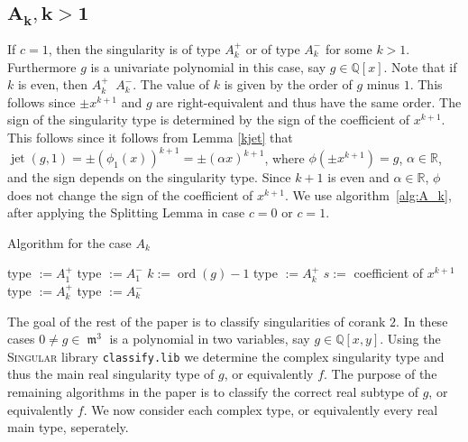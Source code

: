 \documentclass[noend]{amsproc}
\DeclareMathOperator{\ord}{ord}
\DeclareMathOperator{\requiv}{\overset{r}{\sim}}
\DeclareMathOperator{\m}{\mathfrak{m}}
\DeclareMathOperator{\jet}{jet}
\begin{document}
\subsection{$\boldsymbol{A_k, k > 1}$}
If $c=1$, then the singularity is of type
$A_k^+$ or of type $A_k^-$ for some $k>1$. Furthermore $g$ is a univariate
polynomial in this case, say $g\in\mathbb Q[x]$. Note that if $k$ is even, then
$A_k^+\requiv A_k^-$. The value of $k$ is given by the order of $g$ minus $1$.
This follows since $\pm x^{k+1}$ and $g$ are right-equivalent and thus have the
same order. The sign of the singularity type is determined by the sign of the
coefficient of $x^{k+1}$. This follows since it follows from Lemma \ref{kjet}
that $\jet(g,1)=\pm(\phi_1(x))^{k+1}=\pm(\alpha x)^{k+1}$, where $\phi(\pm
x^{k+1})=g$, $\alpha\in\mathbb R$, and the sign depends on the singularity
type.  Since $k+1$ is even and $\alpha\in\mathbb R$, $\phi$ does not change the
sign of the coefficient of $x^{k+1}$. We use algorithm~\ref{alg:A_k}, after
applying the Splitting Lemma in case $c=0$ or $c=1$.

\begin{algorithm}[h]
\caption{\label{alg:A_k} Algorithm for the case $A_k$}
\begin{algorithmic}[1]



\STATE type $:=A_1^+$
\ELSE
\STATE type $:=A_1^-$
\ENDIF
\ENDIF
{}
\STATE $k:= \ord(g)-1$
\STATE type $:=A_k^+$
\ELSE
\STATE $s:=$ coefficient of $x^{k+1}$
\STATE type $:=A_k^+$
\ELSE
\STATE type $:=A_k^-$
\ENDIF
\ENDIF
\ENDIF
{}

\end{algorithmic}
\end{algorithm}

The goal of the rest of the paper is to classify singularities of corank $2$.
In these cases $0\neq g\in\m^3$ is a polynomial in two variables, say
$g\in\mathbb Q[x,y]$. Using the \textsc{Singular} library {\tt classify.lib} we
determine the complex singularity type and thus the main real singularity type
of $g$, or equivalently $f$. The purpose of the remaining algorithms in the
paper is to classify the correct real subtype of $g$, or equivalently $f$. We
now consider each complex type, or equivalently every real main type,
seperately.
\end{document}
